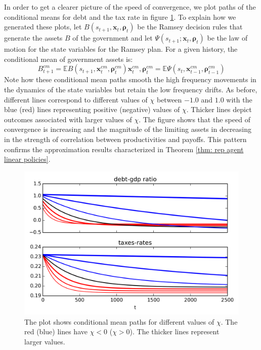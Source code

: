 \documentclass[thmsb,11pt]{article}
\begin{document}
In order to get a clearer picture of the speed of convergence, we plot  paths of the conditional means for debt and the  tax rate in figure \ref{fig:speed_of_convergence}.
To explain how we generated these plots, let $B(s_{t+1},\bm x_t, \bm \rho_t)$ be the Ramsey decision rules
that generate the assets $B$ of the government and let $\Psi \left( s_{t+1};\bm{x}_t,\bm{\rho }_t\right)$ be the law of motion for the state variables for the Ramsey plan.
For a given history, the conditional mean of government assets is:
\begin{subequations}
\begin{equation}
B^{cm}_{t+1}=\mathbb{E}B(s_{t+1},\bm x^{cm}_t,\bm \rho^{cm}_{t})
\end{equation}
 \begin{equation}
 \bm x^{cm}_t,\bm \rho^{cm}_{t}=\mathbb{E}\Psi (s_{t}, \bm x^{cm}_{t-1},\bm \rho^{cm}_{t-1})
 \end{equation}
\end{subequations}
Note how these conditional mean  paths smooth the high frequency movements in the dynamics of the state variables but retain the low frequency drifts.
 As before,  different lines correspond to  different values of $\chi$ between $-1.0$ and $1.0$ with the blue (red) lines representing positive (negative) values of $\chi$.
 Thicker  lines depict outcomes associated with larger values of $\chi$. The figure  shows that the speed of convergence is increasing and the magnitude of the limiting assets in decreasing
 in the strength of correlation between productivities and payoffs. This pattern  confirms the approximation results characterized in Theorem \ref{thm: rep agent linear policies}.

 {
  \begin{figure}
  \label{fig:speed_of_convergence}
    \centering
    \includegraphics[width = .9\textwidth]{cesplots/speed_of_convergence.png}
    \caption{The plot shows conditional mean paths for different values of $\chi$. The red (blue) lines have $\chi<0$ ($\chi>0$). The thicker lines represent larger values.}
  \end{figure}

}
\end{document}
